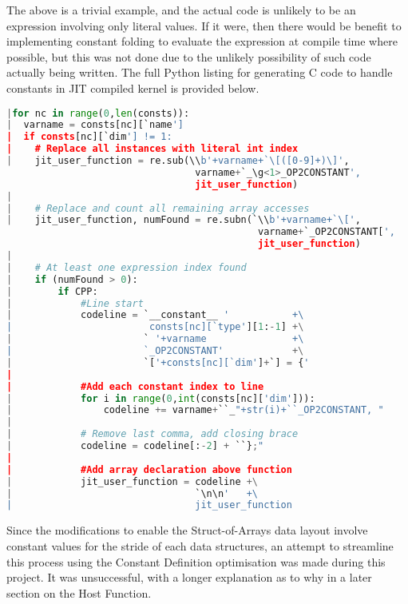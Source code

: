 \noindent The above is a trivial example, and the actual code is unlikely to be an expression involving only literal values. If it were, then there would be benefit to implementing constant folding \cite{constFold} to evaluate the expression at compile time where possible, but this was not done due to the unlikely possibility of such code actually being written.
\clearpage
\noindent The full Python listing for generating C code to handle constants in JIT compiled kernel is provided below.
\begin{lstlisting}[backgroundcolor = \color{lightgray!20}, language=Python]
|for nc in range(0,len(consts)):
|  varname = consts[nc][`name']
|  if consts[nc][`dim'] != 1:
|    # Replace all instances with literal int index
|    jit_user_function = re.sub(\\b'+varname+`\[([0-9]+)\]',
                                 varname+`_\g<1>_OP2CONSTANT',
                                 jit_user_function)
|
|    # Replace and count all remaining array accesses
|    jit_user_function, numFound = re.subn(`\\b'+varname+`\[',
                                            varname+`_OP2CONSTANT[',
                                            jit_user_function)
|
|    # At least one expression index found
|    if (numFound > 0):
|        if CPP:
|            #Line start
|            codeline = `__constant__ '           +\
|                        consts[nc][`type'][1:-1] +\
|                       ` '+varname               +\
|                       `_OP2CONSTANT'            +\
|                       `['+consts[nc][`dim']+`] = {'
|
|            #Add each constant index to line
|            for i in range(0,int(consts[nc]['dim'])):
|                codeline += varname+``_"+str(i)+``_OP2CONSTANT, "
|
|            # Remove last comma, add closing brace
|            codeline = codeline[:-2] + ``};"
|
|            #Add array declaration above function
|            jit_user_function = codeline +\
|                                `\n\n'   +\
|                                jit_user_function
\end{lstlisting}

\tinytitle{SoA optimisation}
Since the modifications to enable the Struct-of-Arrays data layout involve constant values for the stride of each data structures, an attempt to streamline this process using the Constant Definition optimisation was made during this project. It was unsuccessful, with a longer explanation as to why in a later section on the Host Function.
\par


